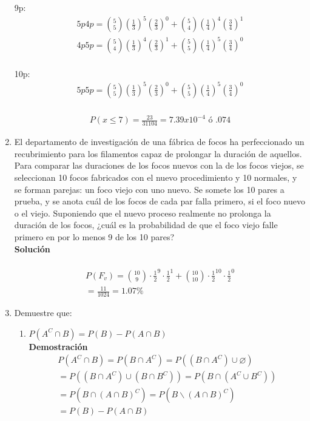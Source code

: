 \begin{enumerate}
    9p:
    \begin{gather*}
    5p 4p = \binom{5}{5}(\frac{1}{3})^{5}(\frac{2}{3})^0 + \binom{5}{4}(\frac{1}{4})^{4}(\frac{3}{4})^1\\
    4p 5p = \binom{5}{4}(\frac{1}{3})^{4}(\frac{2}{3})^1 + \binom{5}{5}(\frac{1}{4})^{5}(\frac{3}{4})^0\\
    \end{gather*}
    
    10p:
    \begin{gather*}
    5p 5p = \binom{5}{5}(\frac{1}{3})^{5}(\frac{2}{3})^0 + \binom{5}{5}(\frac{1}{4})^{5}(\frac{3}{4})^0\\
    \end{gather*}
    
    \begin{gather*}
    P(x \leq 7) = \frac{23}{31104} = 7.39x10^{-4} \text{ ó } .074%
    \end{gather*}
    \item El departamento de investigación de una fábrica de focos ha perfeccionado un recubrimiento para los filamentos capaz de prolongar la duración de aquellos. Para comparar las duraciones de los focos nuevos con la de los focos viejos, se seleccionan 10 focos fabricados con el nuevo procedimiento y 10 normales, y se forman parejas: un foco viejo con uno nuevo. Se somete los 10 pares a prueba, y se anota cuál de los focos de cada par falla primero, si el foco nuevo o el viejo. Suponiendo que el nuevo proceso realmente no prolonga la duración de los focos, ¿cuál es la probabilidad de que el foco viejo falle primero en por lo menos 9 de los 10 pares?
    \\\textbf{Solución}
    \\ \\
    \begin{gather*}
    P(F_v) = \binom{10}{9} \cdot \frac{1}{2}^9 \cdot \frac{1}{2}^1 + \binom{10}{10} \cdot \frac{1}{2}^{10} \cdot \frac{1}{2}^0 \\
    = \frac{11}{1024} = 1.07\%
    \end{gather*}
    
    \item Demuestre que:
    \begin{enumerate}
        \item $P(A^C \cap B) = P(B) - P(A \cap B)$
        \\\textbf{Demostración}
        \begin{gather*}
        P(A^C \cap B) = P(B \cap A^C) = P((B \cap A^C) \cup \diameter) \\
        = P((B \cap A^C) \cup (B \cap B^C)) = P(B \cap (A^C \cup B^C)) \\
        = P(B \cap (A \cap B)^C) = P(B \backslash (A \cap B)^C) \\
        = P(B) - P(A \cap B)
        \end{gather*}
        

\end{enumerate}
\end{enumerate}
